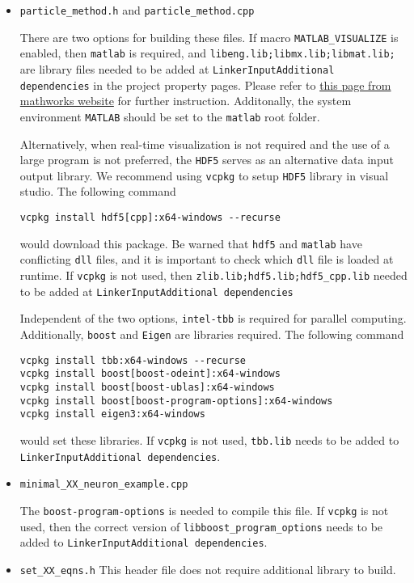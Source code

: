 \documentclass[10pt]{article} %
\begin{document}
\begin{itemize}
\item
\texttt{particle\_method.h} and \texttt{particle\_method.cpp}

There are two options for building these files. If macro \texttt{MATLAB\_VISUALIZE} is enabled, then \texttt{matlab} is required, and \texttt{libeng.lib;libmx.lib;libmat.lib;} are library files needed to be added at \texttt{Linker\textrightarrow Input\textrightarrow Additional dependencies} in the project property pages. Please refer to \href{www.mathworks.com/matlabcentral/answers/406574-how-can-i-compile-a-c-program-that-uses-matlab-engine-c-api-in-visual-studio-2017}{this page from mathworks website} for further instruction. Additonally, the system environment \texttt{MATLAB} should be set to the \texttt{matlab} root folder.

Alternatively, when real-time visualization is not required and the use of a large program is not preferred, the \texttt{HDF5} serves as an alternative data input output library. We recommend using \texttt{vcpkg} to setup \texttt{HDF5} library in visual studio. The following command
\begin{lstlisting}
vcpkg install hdf5[cpp]:x64-windows --recurse
\end{lstlisting}
  would download this package. Be warned that \texttt{hdf5} and \texttt{matlab} have conflicting \texttt{dll} files, and it is important to check which \texttt{dll} file is loaded at runtime. If \texttt{vcpkg} is not used, then \texttt{zlib.lib;hdf5.lib;hdf5\_cpp.lib} needed to be added at \texttt{Linker\textrightarrow Input\textrightarrow Additional dependencies}

Independent of the two options, \texttt{intel-tbb} is required for parallel computing. Additionally, \texttt{boost} and \texttt{Eigen} are libraries required. The following command
\begin{lstlisting}
vcpkg install tbb:x64-windows --recurse
vcpkg install boost[boost-odeint]:x64-windows
vcpkg install boost[boost-ublas]:x64-windows
vcpkg install boost[boost-program-options]:x64-windows
vcpkg install eigen3:x64-windows
\end{lstlisting}

would set these libraries. If \texttt{vcpkg} is not used, \texttt{tbb.lib} needs to be added to \texttt{Linker\textrightarrow Input\textrightarrow Additional dependencies}.

\item
\texttt{minimal\_XX\_neuron\_example.cpp}

The \texttt{boost-program-options} is needed to compile this file. If \texttt{vcpkg} is not used, then the correct version of \texttt{libboost\_program\_options} needs to be added to \texttt{Linker\textrightarrow Input\textrightarrow Additional dependencies}.
\item
\texttt{set\_XX\_eqns.h}
This header file does not require additional library to build.
\end{itemize}
\end{document}
